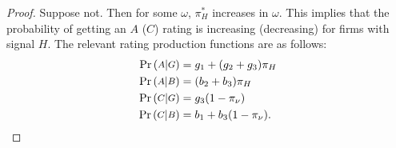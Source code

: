 \documentclass{report}
\begin{document}
\begin{proof}
Suppose not. Then for some $\omega$, $\pi^{*}_{H}$ increases in $\omega$. This implies that the probability of getting an $A$ ($C$) rating is increasing (decreasing) for firms with signal $H$. The relevant rating production functions are as follows:
\begin{align*}
\textup{Pr}\left ( \medmath{A} | \medmath{G} \right) &= g_{1}+(g_{2}+g_{3})\pi_{H}\\
\textup{Pr}\left ( \medmath{A} | \medmath{B} \right) &= (b_{2}+b_{3})\pi_{H}\\
\textup{Pr}\left ( \medmath{C} | \medmath{G} \right) &= g_{3}(1-\pi_{\nu})\\
\textup{Pr}\left ( \medmath{C} | \medmath{B} \right) &= b_{1}+b_{3}(1-\pi_{\nu}).
\end{align*}


\end{proof}
\end{document}
